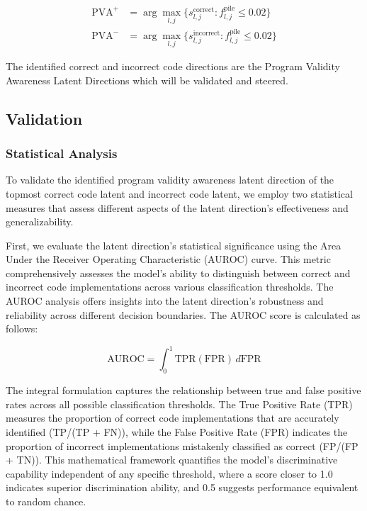 \documentclass[11pt]{article}
\begin{document}
\begin{align}
\text{PVA}^+ &= \arg\max_{l,j} \{s_{l,j}^{\text{correct}} : f_{l,j}^{\text{pile}} \leq 0.02\} \\
\text{PVA}^- &= \arg\max_{l,j} \{s_{l,j}^{\text{incorrect}} : f_{l,j}^{\text{pile}} \leq 0.02\}
\end{align}

The identified correct and incorrect code directions are the Program Validity Awareness Latent Directions which will be validated and steered.

\subsection{Validation}
\subsubsection{Statistical Analysis}
To validate the identified program validity awareness latent direction of the topmost correct code latent and incorrect code latent, we employ two statistical measures that assess different aspects of the latent direction's effectiveness and generalizability. 

First, we evaluate the latent direction's statistical significance using the Area Under the Receiver Operating Characteristic (AUROC) curve. This metric comprehensively assesses the model's ability to distinguish between correct and incorrect code implementations across various classification thresholds. The AUROC analysis offers insights into the latent direction's robustness and reliability across different decision boundaries. The AUROC score is calculated as follows:

\begin{equation} 
\text{AUROC} = \int_0^1 \text{TPR}(\text{FPR})\,d\text{FPR}
\end{equation}

The integral formulation captures the relationship between true and false positive rates across all possible classification thresholds. The True Positive Rate (TPR) measures the proportion of correct code implementations that are accurately identified (TP/(TP + FN)), while the False Positive Rate (FPR) indicates the proportion of incorrect implementations mistakenly classified as correct (FP/(FP + TN)). This mathematical framework quantifies the model's discriminative capability independent of any specific threshold, where a score closer to 1.0 indicates superior discrimination ability, and 0.5 suggests performance equivalent to random chance.
\end{document}
